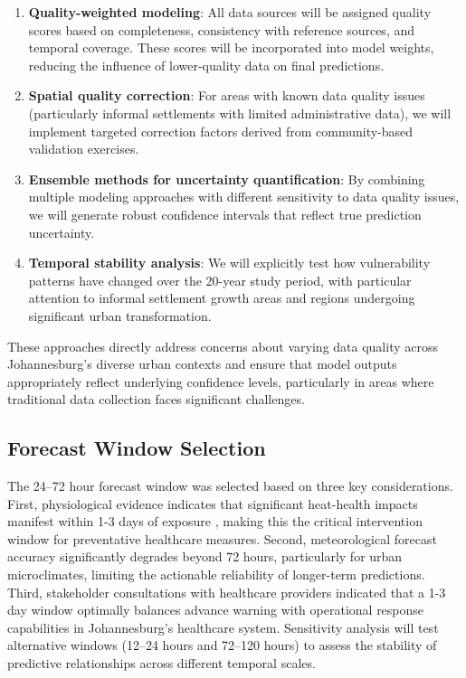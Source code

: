 \begin{enumerate}
    \item \textbf{Quality-weighted modeling}: All data sources will be assigned quality scores based on completeness, consistency with reference sources, and temporal coverage. These scores will be incorporated into model weights, reducing the influence of lower-quality data on final predictions.
    
    \item \textbf{Spatial quality correction}: For areas with known data quality issues (particularly informal settlements with limited administrative data), we will implement targeted correction factors derived from community-based validation exercises.
    
    \item \textbf{Ensemble methods for uncertainty quantification}: By combining multiple modeling approaches with different sensitivity to data quality issues, we will generate robust confidence intervals that reflect true prediction uncertainty.
    
    \item \textbf{Temporal stability analysis}: We will explicitly test how vulnerability patterns have changed over the 20-year study period, with particular attention to informal settlement growth areas and regions undergoing significant urban transformation.
\end{enumerate}

These approaches directly address concerns about varying data quality across Johannesburg's diverse urban contexts and ensure that model outputs appropriately reflect underlying confidence levels, particularly in areas where traditional data collection faces significant challenges.

\subsection{Forecast Window Selection}
The 24--72 hour forecast window was selected based on three key considerations. First, physiological evidence indicates that significant heat-health impacts manifest within 1-3 days of exposure \citep{Gasparrini2015, Kinney2020}, making this the critical intervention window for preventative healthcare measures. Second, meteorological forecast accuracy significantly degrades beyond 72 hours, particularly for urban microclimates, limiting the actionable reliability of longer-term predictions. Third, stakeholder consultations with healthcare providers indicated that a 1-3 day window optimally balances advance warning with operational response capabilities in Johannesburg's healthcare system. Sensitivity analysis will test alternative windows (12--24 hours and 72--120 hours) to assess the stability of predictive relationships across different temporal scales.

